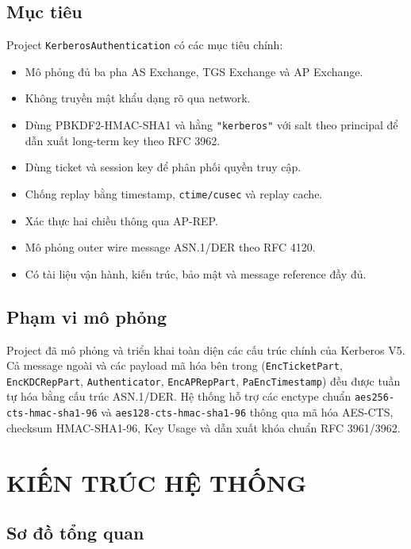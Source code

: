 \documentclass[12pt]{article}
\begin{document}
\subsection{Mục tiêu}

Project \texttt{KerberosAuthentication} có các mục tiêu chính:
\begin{itemize}
    \item Mô phỏng đủ ba pha AS Exchange, TGS Exchange và AP Exchange.
    \item Không truyền mật khẩu dạng rõ qua network.
    \item Dùng PBKDF2-HMAC-SHA1 và hằng \texttt{"kerberos"} với salt theo principal để dẫn xuất long-term key theo RFC 3962.
    \item Dùng ticket và session key để phân phối quyền truy cập.
    \item Chống replay bằng timestamp, \texttt{ctime/cusec} và replay cache.
    \item Xác thực hai chiều thông qua AP-REP.
    \item Mô phỏng outer wire message ASN.1/DER theo RFC 4120.
    \item Có tài liệu vận hành, kiến trúc, bảo mật và message reference đầy đủ.
\end{itemize}

\subsection{Phạm vi mô phỏng}

Project đã mô phỏng và triển khai toàn diện các cấu trúc chính của Kerberos V5. Cả message ngoài và các payload mã hóa bên trong (\texttt{EncTicketPart}, \texttt{EncKDCRepPart}, \texttt{Authenticator}, \texttt{EncAPRepPart}, \texttt{PaEncTimestamp}) đều được tuần tự hóa bằng cấu trúc ASN.1/DER. Hệ thống hỗ trợ các enctype chuẩn \texttt{aes256-cts-hmac-sha1-96} và \texttt{aes128-cts-hmac-sha1-96} thông qua mã hóa AES-CTS, checksum HMAC-SHA1-96, Key Usage và dẫn xuất khóa chuẩn RFC 3961/3962.

\section{KIẾN TRÚC HỆ THỐNG}

\subsection{Sơ đồ tổng quan}
\end{document}
